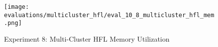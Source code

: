 \begin{figure}[H]
    \begin{adjustwidth}{-0.2\paperwidth}{-0.2\paperwidth}
        \centering
        \texttt{[image: evaluations/multicluster\_hfl/eval\_10\_8\_multicluster\_hfl\_mem.png]}
        \caption{Experiment 8: Multi-Cluster HFL Memory Utilization}
        \label{fig:eval_8_mem}
    \end{adjustwidth}
\end{figure}